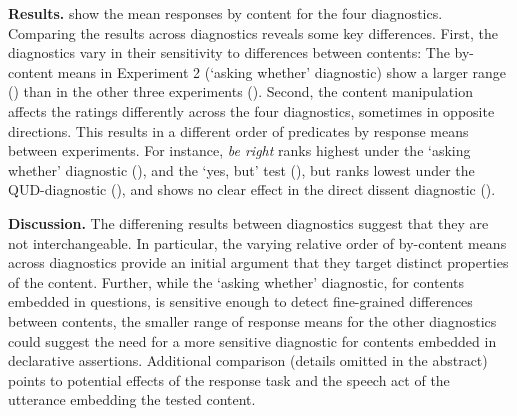 \documentclass[11pt, a4paper]{article}
\begin{document}
\vspace{.1\baselineskip} \noindent
{\bf Results.}
   show the mean responses by content for the four diagnostics. Comparing the results across diagnostics reveals some key differences.
  First, the diagnostics vary in their sensitivity to differences between contents: The by-content means in Experiment 2 (`asking whether' diagnostic) show a larger range () than in the other three experiments ().
  Second, the content manipulation affects the ratings differently across the four diagnostics, sometimes in opposite directions. This results in a different order of predicates by response means between experiments.
  For instance, \emph{be right} ranks highest under the `asking whether' diagnostic (), and the `yes, but' test (), but ranks lowest under the QUD-diagnostic (), and shows no clear effect in the direct dissent diagnostic ().


\vspace{.1\baselineskip} \noindent
{\bf Discussion.}
  The differening results between diagnostics suggest that they are not interchangeable. In particular, the varying relative order of by-content means across diagnostics provide an initial argument that they target distinct properties of the content.
  Further, while the `asking whether' diagnostic, for contents embedded in questions, is sensitive enough to detect fine-grained differences between contents, the smaller range of response means for the other diagnostics could suggest the need for a more sensitive diagnostic for contents embedded in declarative assertions.
  Additional comparison \citealt{syrett2015experimental} (details omitted in the abstract) points to potential effects of the response task and the speech act of the utterance embedding the tested content.




\end{document}
